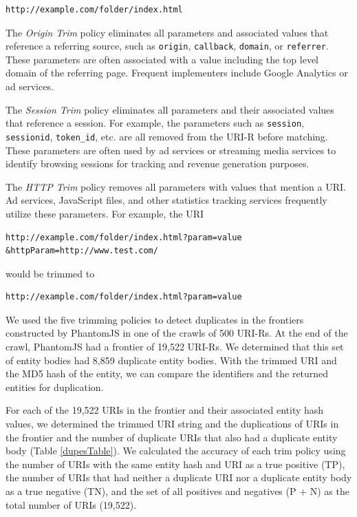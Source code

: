 \documentclass{ipres_proc_article-sp}
\begin{document}
\begin{verbatim}
http://example.com/folder/index.html
\end{verbatim} 


 
The \emph{Origin Trim} policy eliminates all parameters and associated values that reference a referring source, such as \texttt{origin}, \texttt{callback}, \texttt{domain}, or \texttt{referrer}. These parameters are often associated with a value including the top level domain of the referring page. Frequent implementers include Google Analytics or ad services.

The \emph{Session Trim} policy eliminates all parameters and their associated values that reference a session. 
For example, the parameters such as \texttt{session}, \texttt{sessionid}, \texttt{token\_id}, etc. are all removed from the URI-R before matching. These parameters are often used by ad services or streaming media services to identify browsing sessions for tracking and revenue generation purposes.

The \emph{HTTP Trim} policy removes all parameters with values that mention a URI. Ad services, JavaScript files, and other statistics tracking services frequently utilize these parameters. 
For example, the URI 

\vskip -3mm
\begin{verbatim}
http://example.com/folder/index.html?param=value
&httpParam=http://www.test.com/
\end{verbatim}
\vskip -3mm

\noindent would be trimmed to 
\vskip -3mm
 
\begin{verbatim}
http://example.com/folder/index.html?param=value
\end{verbatim}
\vskip -3mm
  

We used the five trimming policies to detect duplicates in the frontiers constructed by PhantomJS in one of the crawls of 500 URI-Rs. At the end of the crawl, PhantomJS had a frontier of 19,522 URI-Rs. We determined that this set of entity bodies had 8,859 duplicate entity bodies. With the trimmed URI and the MD5 hash of the entity, we can compare the identifiers and the returned entities for duplication. 


For each of the 19,522 URIs in the frontier and their associated entity hash values, we determined the trimmed URI string and the duplications of URIs in the frontier and the number of duplicate URIs that also had a duplicate entity body (Table \ref{dupesTable}). We calculated the accuracy of each trim policy using the number of URIs with the same entity hash and URI as a true positive (TP), the number of URIs that had neither a duplicate URI nor a duplicate entity body as a true negative (TN), and the set of all positives and negatives (P + N) as the total number of URIs (19,522). 
\end{document}
